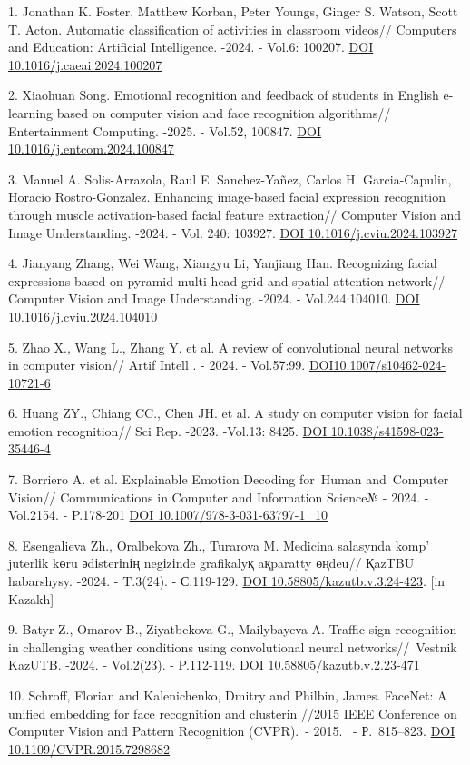 \begin{references}
1. Jonathan K. Foster, Matthew Korban, Peter Youngs, Ginger S. Watson,
Scott T. Acton. Automatic classification of activities in classroom
videos// Computers and Education: Artificial Intelligence. -2024. -
Vol.6: 100207. \href{https://doi.org/10.1016/j.caeai.2024.100207}{DOI
10.1016/j.caeai.2024.100207}

2. Xiaohuan Song. Emotional recognition and feedback of students in
English e-learning based on computer vision and face recognition
algorithms// Entertainment Computing. -2025. - Vol.52, 100847.
\href{https://doi.org/10.1016/j.entcom.2024.100847}{DOI
10.1016/j.entcom.2024.100847}

3. Manuel A. Solis-Arrazola, Raul E. Sanchez-Yañez, Carlos H.
Garcia-Capulin, Horacio Rostro-Gonzalez. Enhancing image-based facial
expression recognition through muscle activation-based facial feature
extraction// Computer Vision and Image Understanding. -2024. - Vol.
240: 103927. \href{https://doi.org/10.1016/j.cviu.2024.103927}{DOI
10.1016/j.cviu.2024.103927}

4. Jianyang Zhang, Wei Wang, Xiangyu Li, Yanjiang Han. Recognizing facial
expressions based on pyramid multi-head grid and spatial attention
network// Computer Vision and Image Understanding. -2024. -
Vol.244:104010. \href{https://doi.org/10.1016/j.cviu.2024.104010}{DOI
10.1016/j.cviu.2024.104010}

5. Zhao X., Wang L., Zhang Y. et al. A review of convolutional neural
networks in computer vision// Artif Intell . - 2024. - Vol.57:99.
\href{https://doi.org/10.1007/s10462-024-10721-6}{DOI10.1007/s10462-024-10721-6}

6. Huang ZY., Chiang CC., Chen JH. et al. A study on computer vision for
facial emotion recognition// Sci Rep. -2023. -Vol.13: 8425.
\href{https://doi.org/10.1038/s41598-023-35446-4}{DOI
10.1038/s41598-023-35446-4}

7. Borriero A. et al. Explainable Emotion Decoding for~Human and~Computer
Vision// Communications in Computer and Information Science№ - 2024. -
Vol.2154. - P.178-201
\href{https://doi.org/10.1007/978-3-031-63797-1_10}{DOI
10.1007/978-3-031-63797-1\_10}

8. Esengalieva Zh., Oralbekova Zh., Turarova M. Medicina salasynda
komp' juterlіk kөru әdіsterіnің negіzіnde grafikalyқ
aқparatty өңdeu// ҚazTBU habarshysy. -2024. - T.3(24). - С.119-129.
\href{https://doi.org/10.58805/kazutb.v.3.24-423}{DOI
10.58805/kazutb.v.3.24-423}. {[}in Kazakh{]}

9. Batyr Z., Omarov B., Ziyatbekova G., Mailybayeva A. Traffic sign
recognition in challenging weather conditions using convolutional neural
networks//~Vestnik KazUTB. -2024. - Vol.2(23). - P.112-119.
\href{https://doi.org/10.58805/kazutb.v.2.23-471}{DOI
10.58805/kazutb.v.2.23-471}

10. Schroff, Florian and Kalenichenko, Dmitry and Philbin, James.
FaceNet: A unified embedding for face recognition and clusterin //2015
IEEE Conference on Computer Vision and Pattern Recognition (CVPR).~-
2015. ~- Р.~815--823.
\href{https://doi.org/10.1109/CVPR.2015.7298682}{DOI
10.1109/CVPR.2015.7298682}
\end{references}

